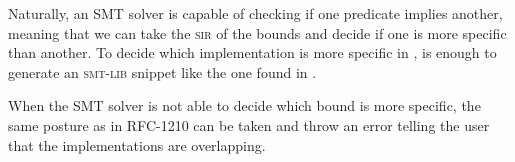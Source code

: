 Naturally, an SMT solver is capable of checking if one predicate implies
another, meaning that we can take the \textsc{sir} of the bounds and decide if
one is more specific than another. To decide which implementation is more
specific in , is enough to generate an
\textsc{smt-lib} snippet like the one found in .

When the SMT solver is not able to decide which bound is more specific, the
same posture as in RFC-1210 can be taken and throw an error telling the user
that the implementations are overlapping.

